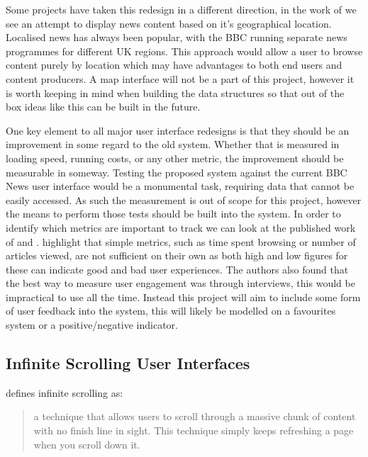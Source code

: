 \documentclass[12pt,titlepage]{article}
\begin{document}
  Some projects have taken this redesign in a different direction, in the work of
  \cite{newsstand} we see an attempt to display news content based on it's
  geographical location. Localised news has always been popular, with the BBC
  running separate news programmes for different UK regions. This approach would
  allow a user to browse content purely by location which may have advantages to
  both end users and content producers. A map interface will not be a part of
  this project, however it is worth keeping in mind when building the data
  structures so that out of the box ideas like this can be built in the future.

  One key element to all major user interface redesigns is that they should be
  an improvement in some regard to the old system. Whether that is measured in
  loading speed, running costs, or any other metric, the improvement should be
  measurable in someway. Testing the proposed system against the current BBC
  News user interface would be a monumental task, requiring data that cannot be
  easily accessed. As such the measurement is out of scope for this project,
  however the means to perform those tests should be built into the system. In
  order to identify which metrics are important to track we can look at the
  published work of \cite{ux} and \cite{engagement}. \cite{ux} highlight that
  simple metrics, such as time spent browsing or number of articles viewed, are
  not sufficient on their own as both high and low figures for these can
  indicate good and bad user experiences. The authors also found that the best
  way to measure user engagement was through interviews, this would be
  impractical to use all the time. Instead this project will aim to include some
  form of user feedback into the system, this will likely be modelled on a
  favourites system or a positive/negative indicator.

  \subsection{Infinite Scrolling User Interfaces}

  \citep{newtarget} defines infinite scrolling as:

  \begin{quote}
    a technique that allows users to scroll through a massive chunk of content
    with no finish line in sight. This technique simply keeps refreshing a page
    when you scroll down it.
  \end{quote}
\end{document}
